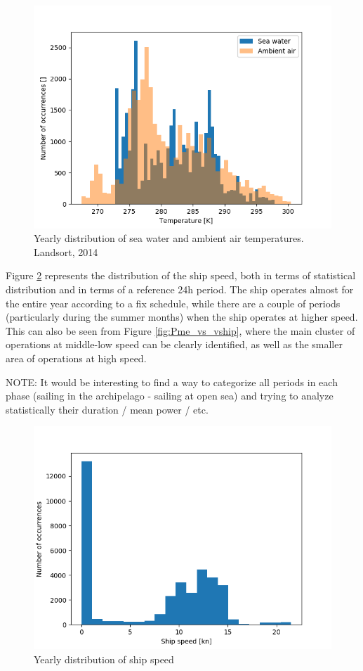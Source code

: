 \documentclass[preprint,12pt]{elsarticle}
\begin{document}
\begin{figure}
	\centering
	\includegraphics[width=0.9\linewidth]{Figures/Tsea_hist}
	\caption{Yearly distribution of sea water and ambient air temperatures. Landsort, 2014}
	\label{fig:Tsea_hist}
\end{figure}

Figure \ref{fig:vship_hist} represents the distribution of the ship speed, both in terms of statistical distribution and in terms of a reference 24h period. The ship operates almost for the entire year according to a fix schedule, while there are a couple of periods (particularly during the summer months) when the ship operates at higher speed. This can also be seen from Figure \ref{fig:Pme_vs_vship}, where the main cluster of operations at middle-low speed can be clearly identified, as well as the smaller area of operations at high speed. 

NOTE: It would be interesting to find a way to categorize all periods in each phase (sailing in the archipelago - sailing at open sea) and trying to analyze statistically their duration / mean power / etc.

\begin{figure}
	\centering
	\includegraphics[width=0.9\linewidth]{Figures/vship_hist}
	\caption{Yearly distribution of ship speed}
	\label{fig:vship_hist}
\end{figure}
\end{document}

